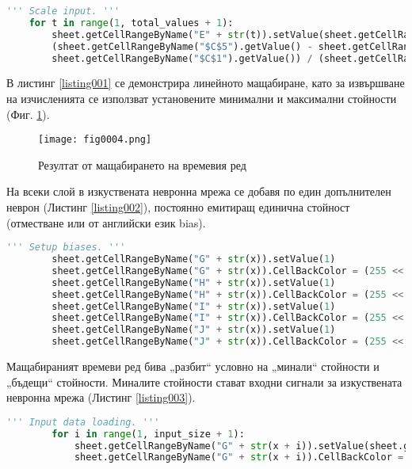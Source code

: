 \begin{lstlisting}[caption=Мащабиране на оригиналния времеви ред, language=Python, basicstyle=\tiny, label=listing001]
    ''' Scale input. '''
    for t in range(1, total_values + 1):
        sheet.getCellRangeByName("E" + str(t)).setValue(sheet.getCellRangeByName("$C$4").getValue() + 
        (sheet.getCellRangeByName("$C$5").getValue() - sheet.getCellRangeByName("$C$4").getValue()) * ((sheet.getCellRangeByName("A" + str(t)).getValue() - 
        sheet.getCellRangeByName("$C$1").getValue()) / (sheet.getCellRangeByName("$C$2").getValue() - sheet.getCellRangeByName("$C$1").getValue())))
\end{lstlisting}

В листинг \ref{listing001} се демонстрира линейното мащабиране, като за извършване на изчисленията се използват установените минимални и максимални стойности (Фиг. \ref{fig004}). 

\begin{figure}[H]
  \centering
  \texttt{[image: fig0004.png]}
  \caption{Резултат от мащабирането на времевия ред}
\label{fig004}
\end{figure}

На всеки слой в изкуствената невронна мрежа се добавя по един допълнителен неврон (Листинг \ref{listing002}), постоянно емитиращ единична стойност (отместване или от английски език bias).

\begin{lstlisting}[caption=Неврони емитиращи постоянно единичен сигнал, language=Python, basicstyle=\tiny, label=listing002]
        ''' Setup biases. '''
        sheet.getCellRangeByName("G" + str(x)).setValue(1)
        sheet.getCellRangeByName("G" + str(x)).CellBackColor = (255 << 16 | 255 << 8 | 0)
        sheet.getCellRangeByName("H" + str(x)).setValue(1)
        sheet.getCellRangeByName("H" + str(x)).CellBackColor = (255 << 16 | 255 << 8 | 0)
        sheet.getCellRangeByName("I" + str(x)).setValue(1)
        sheet.getCellRangeByName("I" + str(x)).CellBackColor = (255 << 16 | 255 << 8 | 0)
        sheet.getCellRangeByName("J" + str(x)).setValue(1)
        sheet.getCellRangeByName("J" + str(x)).CellBackColor = (255 << 16 | 255 << 8 | 0)
\end{lstlisting}

Мащабираният времеви ред бива „разбит“ условно на „минали“ стойности и „бъдещи“ стойности. Миналите стойности стават входни сигнали за изкуствената невронна мрежа (Листинг \ref{listing003}).

\begin{lstlisting}[caption=Формиране на входния слой, language=Python, basicstyle=\tiny, label=listing003]
        ''' Input data loading. '''
        for i in range(1, input_size + 1):
            sheet.getCellRangeByName("G" + str(x + i)).setValue(sheet.getCellRangeByName("E" + str(t + i)).getValue())
            sheet.getCellRangeByName("G" + str(x + i)).CellBackColor = (255 << 16 | 0 << 8 | 0)
\end{lstlisting}

